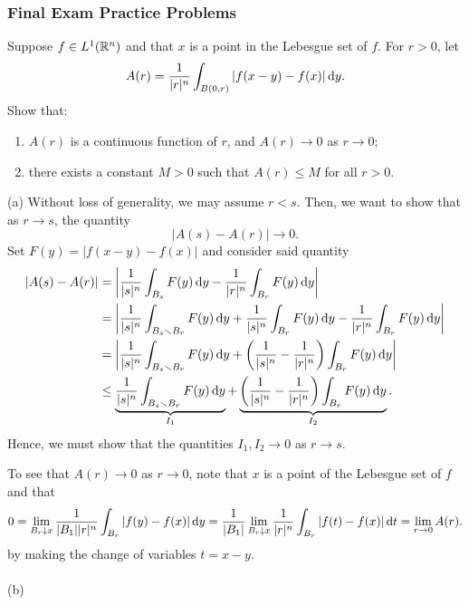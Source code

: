 \subsubsection{Final Exam Practice Problems}
\setcounter{exercise}{0}
\setcounter{equation}{0}

\begin{problem}
  Suppose \(f\in L^1(\mathbb{R}^n)\) and that \(x\) is a point in the Lebesgue
  set of \(f\). For \(r>0\), let
  \[
    A(r)=\frac{1}{|r|^n}\int_{B(0,r)}|f( x - y )-f( x )|\mathop{}\!\mathrm{d} y .
  \]
  Show that:
  \begin{enumerate}[label=(\alph*)]
    \hfill
  \item \(A(r)\) is a continuous function of \(r\), and \(A(r)\to 0\) as
    \(r\to 0\);
  \item there exists a constant \(M>0\) such that \(A(r)\leq M\) for all
    \(r>0\).
  \end{enumerate}
\end{problem}
\begin{solution}
  (a) Without loss of generality, we may assume \(r<s\). Then, we want to
  show that as \(r\to s\), the quantity
  \[
    |A(s)-A(r)|\longrightarrow 0.
  \]
  Set \(F( y )= |f( x - y )-f( x )|\) and consider said quantity
  \begin{align*}
    |A(s)-A(r)|
    &=\left|
      \frac{1}{|s|^n}\int_{B_s}F( y )\diff y
      -
      \frac{1}{|r|^n}\int_{B_r}F( y )\diff y
      \right|\\
    &=\left|
      \frac{1}{|s|^n}\int_{B_s\setminus B_r}F( y )\diff y +
      \frac{1}{|s|^n}\int_{B_r}F( y )\diff y -
      \frac{1}{|r|^n}\int_{B_r}F( y )\diff y
      \right|\\
    &=\left|
      \frac{1}{|s|^n}\int_{B_s\setminus B_r}F( y )\diff y
      +\left(\frac{1}{|s|^n}-\frac{1}{|r|^n}\right)\int_{B_r}F( y )\diff y
      \right|\\
    &\leq
      \underbrace{\frac{1}{|s|^n}\int_{B_s\setminus B_r}F( y )\diff y }_{I_1}
      +\underbrace{\left(\frac{1}{|s|^n}-\frac{1}{|r|^n}\right)\int_{B_r}F( y )\diff y }_{I_2}.
  \end{align*}
  Hence, we must show that the quantities \(I_1,I_2\to 0\) as \(r\to s\).

  To see that \(A(r)\to 0\) as \(r\to 0\), note that \(x\) is a point of
  the Lebesgue set of \(f\) and that
  \[
    0=\lim_{B_r\downarrow x }\frac{1}{|B_1||r|^n}\int_{B_r}|f( y )-f( x
    )|\mathop{}\!\mathrm{d} y =\frac{1}{|B_1|}\lim_{B_r\downarrow x
    }\frac{1}{|r|^n}\int_{B_r}|f( t )-f( x )|\mathop{}\!\mathrm{d} t =\lim_{r\to 0}A(r).
  \]
  by making the change of variables \(t=x-y\).
  \\\\
  (b)
\end{solution}

